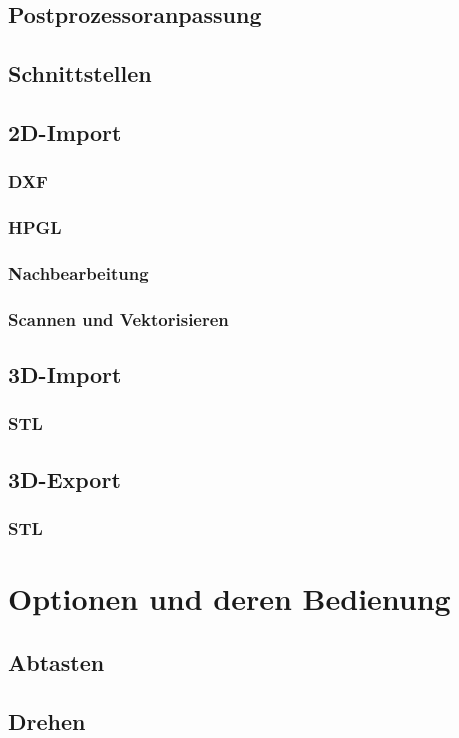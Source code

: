 \documentclass[a5paper]{book}
\begin{document}
	\section{Postprozessoranpassung} 
	\section{Schnittstellen} 
	\section{2D-Import} 
		\subsection{DXF}
		\subsection{HPGL} 
		\subsection{Nachbearbeitung} 
		\subsection{Scannen und Vektorisieren} 
	\section{3D-Import} 
		\subsection{STL}
	\section{3D-Export} 
		\subsection{STL}

\chapter{Optionen und deren Bedienung} 
	\section{Abtasten}
	\section{Drehen} 
\end{document}
